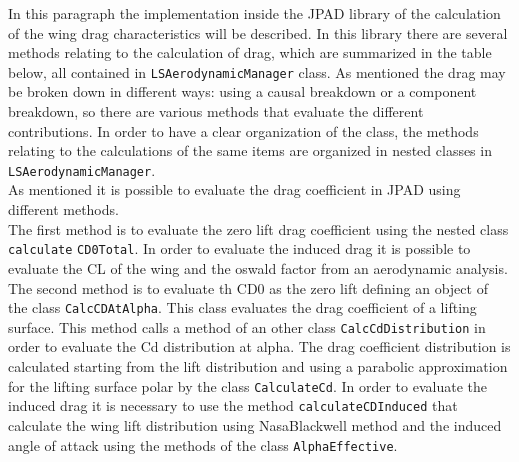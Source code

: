In this paragraph the implementation inside the JPAD library of the calculation of the wing drag characteristics will be described. In this library there are several methods relating to the calculation of drag, which are summarized in the table below, all contained in \texttt{LSAerodynamicManager} class. As mentioned the drag may be broken down in different ways: using a causal breakdown or a component breakdown, so there are various methods that evaluate the different contributions. In order to have a clear organization of the class, the methods relating to the calculations of the same items are organized in nested classes in  \texttt{LSAerodynamicManager}.\\ 
As mentioned it is possible to evaluate the drag coefficient in JPAD using different methods. \\
The first method is to evaluate the zero lift drag coefficient using the nested class \texttt{calculate} \texttt{CD0Total}. In order to evaluate the induced drag it is possible to evaluate the CL of the wing and the oswald factor from an aerodynamic analysis.\\
The second method is to evaluate th CD0 as the zero lift defining an object of the class  \texttt{CalcCDAtAlpha}. This class evaluates the drag coefficient of a lifting surface. This method calls a method of an other class \texttt{CalcCdDistribution} in order to evaluate the Cd distribution at alpha. The drag coefficient distribution is calculated starting from the lift distribution and using a parabolic approximation for the lifting surface polar by the class \texttt{CalculateCd}.  In order to evaluate the induced drag it is necessary to use the method \texttt{calculateCDInduced} that calculate the wing lift distribution using NasaBlackwell method and the induced angle of attack using the methods of the class \texttt{AlphaEffective}.\\
